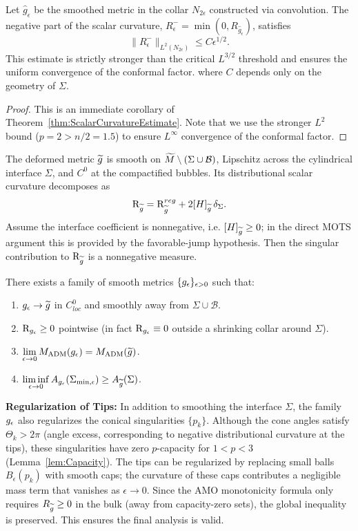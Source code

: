 \begin{lemma}
\label{lem:ScalarDip_Refined}
Let $\hat{g}_\epsilon$ be the smoothed metric in the collar $N_{2\epsilon}$ constructed via convolution. The negative part of the scalar curvature, $R^-_\epsilon = \min(0, R_{\hat{g}_\epsilon})$, satisfies
\[ \|R^-_\epsilon\|_{L^{2}(N_{2\epsilon})} \le C \epsilon^{1/2}. \]
This estimate is strictly stronger than the critical $L^{3/2}$ threshold and ensures the uniform convergence of the conformal factor.
where $C$ depends only on the geometry of $\Sigma$.
\end{lemma}
\begin{proof}
This is an immediate corollary of Theorem~\ref{thm:ScalarCurvatureEstimate}. Note that we use the stronger $L^2$ bound ($p=2 > n/2=1.5$) to ensure $L^\infty$ convergence of the conformal factor.
\end{proof}

\begin{theorem}\label{thm:MiaoPiubelloSmoothing}
The deformed metric $\widetilde{g}$ is smooth on $\widetilde{M} \setminus (\Sigma \cup \mathcal{B})$, Lipschitz across the cylindrical interface $\Sigma$, and $C^0$ at the compactified bubbles. Its distributional scalar curvature decomposes as
\begin{equation}
    \mathrm{R}_{\widetilde{g}} = \mathrm{R}_{\widetilde{g}}^{reg} + 2[H]_{\widetilde{g}}\,\delta_\Sigma.
\end{equation}
Assume the interface coefficient is nonnegative, i.e. $[H]_{\widetilde{g}} \ge 0$; in the direct MOTS argument this is provided by the favorable-jump hypothesis. Then the singular contribution to $\mathrm{R}_{\widetilde{g}}$ is a nonnegative measure.

There exists a family of smooth metrics $\{ g_{\epsilon} \}_{\epsilon>0}$ such that:
\begin{enumerate}
    \item $g_{\epsilon} \to \widetilde{g}$ in $C^0_{loc}$ and smoothly away from $\Sigma \cup \mathcal{B}$.
    \item $\mathrm{R}_{g_{\epsilon}} \ge 0$ pointwise (in fact $\mathrm{R}_{g_{\epsilon}} \equiv 0$ outside a shrinking collar around $\Sigma$).
    \item $\displaystyle \lim_{\epsilon \to 0} M_{\mathrm{ADM}}(g_{\epsilon}) = M_{\mathrm{ADM}}(\widetilde{g})$.
    \item $\displaystyle \liminf_{\epsilon \to 0} A_{g_{\epsilon}}(\Sigma_{\min, \epsilon}) \ge A_{\widetilde{g}}(\Sigma)$.
\end{enumerate}
\textbf{Regularization of Tips:} In addition to smoothing the interface $\Sigma$, the family $g_{\epsilon}$ also regularizes the conical singularities $\{p_k\}$. Although the cone angles satisfy $\Theta_k > 2\pi$ (angle excess, corresponding to negative distributional curvature at the tips), these singularities have zero $p$-capacity for $1 < p < 3$ (Lemma~\ref{lem:Capacity}). The tips can be regularized by replacing small balls $B_\epsilon(p_k)$ with smooth caps; the curvature of these caps contributes a negligible mass term that vanishes as $\epsilon \to 0$. Since the AMO monotonicity formula only requires $R_{\widetilde{g}} \ge 0$ in the bulk (away from capacity-zero sets), the global inequality is preserved. This ensures the final analysis is valid.
\end{theorem}

